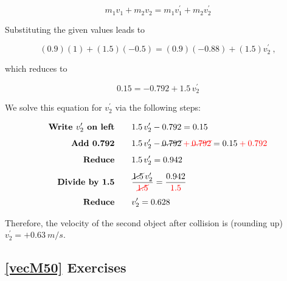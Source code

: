 \documentclass{article}
\numberwithin{equation}{section}
\numberwithin{figure}{section}
\begin{document}
\begin{equation*} 
    m_1 v_1 + m_2 v_2 = m_1 v_1^{\prime} + m_2 v_2^{\prime}
\end{equation*}

Substituting the given values leads to

\begin{equation*}
    (0.9)(1) + (1.5)(-0.5) = (0.9)(-0.88) + (1.5) v_2^{\prime}\ ,
\end{equation*}

which reduces to

\begin{equation*}
    0.15 = -0.792 + 1.5\,v_2^{\prime}
\end{equation*}

We solve this equation for $v_2^{\prime}$ via the following steps:
\vspace{-1em}

\begin{align*}
    \textbf{Write $v_2^{\prime}$ on left} \qquad & 1.5\,v_2^{\prime} - 0.792 = 0.15\\[1ex]
    \textbf{Add 0.792} \qquad & 1.5\,v_2^{\prime} - \cancel{0.792} \mathbin{\color{red} +} \textcolor{red}{\cancel{0.792}} = 0.15 \mathbin{\color{red} +} \textcolor{red}{0.792}\\[1ex]
    \textbf{Reduce} \qquad & 1.5\,v_2^{\prime} = 0.942\\[1ex]
    \textbf{Divide by 1.5} \qquad & \frac{\cancel{1.5}\,v_2^{\prime}}{\textcolor{red}{\cancel{1.5}}} = \frac{0.942}{\textcolor{red}{1.5}}\\[1ex]
    \textbf{Reduce} \qquad & v_2^{\prime} = 0.628
\end{align*}

Therefore, the velocity of the second object after collision is (rounding up) $v_2^{\prime} = +\SI{0.63}{m/s}$.

\cyanhrule

\subsection*{\ref{vecM50} Exercises}
\end{document}
